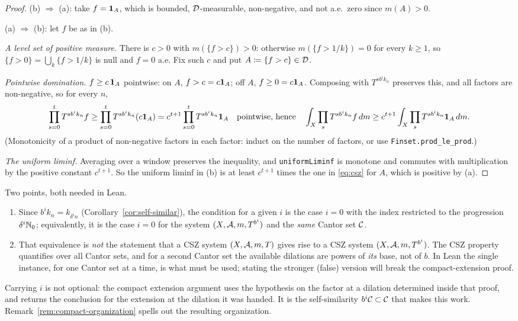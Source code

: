 \begin{proof}
  (b) $\Rightarrow$ (a): take $f = \mathbf{1}_A$, which is bounded, $\mathcal{D}$-measurable, non-negative,
  and not a.e.\ zero since $m(A) > 0$.

  (a) $\Rightarrow$ (b): let $f$ be as in (b).

  \emph{A level set of positive measure.}  There is $c > 0$ with $m(\{f > c\}) > 0$: otherwise
  $m(\{f > 1/k\}) = 0$ for every $k \geq 1$, so $\{f > 0\} = \bigcup_k\{f > 1/k\}$ is null and
  $f = 0$ a.e.  Fix such $c$ and put $A \coloneqq \{f > c\} \in \mathcal{D}$.

  \emph{Pointwise domination.}  $f \geq c\,\mathbf{1}_A$ pointwise: on $A$, $f > c = c\mathbf{1}_A$; off
  $A$, $f \geq 0 = c\mathbf{1}_A$.  Composing with $T^{sb^ik_n}$ preserves this, and all factors are
  non-negative, so for every $n$,
  \[
    \prod_{s=0}^{t} T^{sb^ik_n}f \geq \prod_{s=0}^{t} T^{sb^ik_n}(c\mathbf{1}_A) = c^{t+1}\prod_{s=0}^{t} T^{sb^ik_n}\mathbf{1}_A
    \quad\text{pointwise, hence}\quad
    \int_X \prod_{s} T^{sb^ik_n}f\,dm \geq c^{t+1} \int_X \prod_s T^{sb^ik_n}\mathbf{1}_A\,dm .
  \]
  (Monotonicity of a product of non-negative factors in each factor: induct on the number of
  factors, or use \texttt{Finset.prod\_le\_prod}.)

  \emph{The uniform liminf.}  Averaging over a window preserves the inequality, and
  \texttt{uniformLiminf} is monotone and commutes with multiplication by the positive constant
  $c^{t+1}$.  So the uniform liminf in (b) is at least $c^{t+1}$ times the one in \eqref{eq:csz}
  for $A$, which is positive by (a).
\end{proof}

\begin{remark}
  \label{rem:dilation}
  Two points, both needed in Lean.
  \begin{enumerate}
    \item Since $b^i k_n = k_{\delta^i n}$ (Corollary~\ref{cor:self-similar}), the condition for
      a given $i$ is the case $i = 0$ with the index restricted to the progression
      $\delta^i \mathbb{N}_0$; equivalently, it is the case $i=0$ for the system
      $(X,\mathcal{A},m,T^{b^i})$ and the \emph{same} Cantor set $\mathcal{C}$.
    \item That equivalence is \emph{not} the statement that a CSZ system $(X,\mathcal{A},m,T)$ gives
      rise to a CSZ system $(X,\mathcal{A},m,T^{b^i})$.  The CSZ property quantifies over all Cantor
      sets, and for a second Cantor set the available dilations are powers of \emph{its} base,
      not of $b$.  In Lean the single instance, for one Cantor set at a time, is what must be
      used; stating the stronger (false) version will break the compact-extension proof.
  \end{enumerate}
  Carrying $i$ is not optional: the compact extension argument uses the hypothesis on the factor
  at a dilation determined inside that proof, and returns the conclusion for the extension at the
  dilation it was handed.  It is the self-similarity $b^i \mathcal{C} \subset \mathcal{C}$ that makes
  this work.  Remark~\ref{rem:compact-organization} spells out the resulting organization.
\end{remark}

